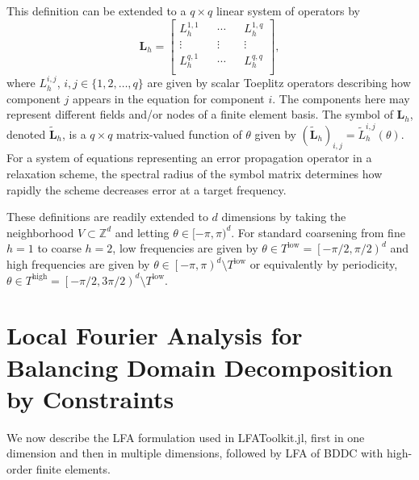 \documentclass[review]{siamart190516}
\begin{document}
This definition can be extended to a $q \times q$ linear system of operators by
\begin{equation}
\mathbf{L}_h =
\begin{bmatrix}
    L_h^{1, 1} && \cdots && L_h^{1, q}        \\
    \vdots               && \vdots && \vdots  \\
    L_h^{q, 1} && \cdots && L_h^{q, q}        \\
\end{bmatrix},
\end{equation}
where $L_h^{i, j}$, $i, j \in \lbrace 1, 2, \dots, q \rbrace$ are given by scalar Toeplitz operators describing how component $j$ appears in the equation for component $i$.
The components here may represent different fields and/or nodes of a finite element basis.
The symbol of $\mathbf{L}_h$, denoted $\tilde{\mathbf{L}}_h$, is a $q \times q$ matrix-valued function of $\theta$ given by $\left( \tilde{\mathbf{L}}_h \right)_{i, j} = \tilde{L}_h^{i, j} \left( \theta \right)$.
For a system of equations representing an error propagation operator in a relaxation scheme, the spectral radius of the symbol matrix determines how rapidly the scheme decreases error at a target frequency.

These definitions are readily extended to $d$ dimensions by taking the neighborhood $V \subset \mathbb Z^d$ and letting $\theta \in [-\pi,\pi)^d$.
For standard coarsening from fine $h=1$ to coarse $h=2$, low frequencies are given by $\theta \in T^{\text{low}} = \left[ - \pi / 2, \pi / 2 \right)^d$ and high frequencies are given by $\theta \in \left[-\pi, \pi \right)^d \setminus T^{\text{low}}$ or equivalently by periodicity, $\theta \in T^{\text{high}} = \left[ - \pi / 2, 3 \pi / 2 \right)^d \setminus T^{\text{low}}$.

\section{Local Fourier Analysis for Balancing Domain Decomposition by Constraints}\label{sec:lfa}

We now describe the LFA formulation used in LFAToolkit.jl, first in one dimension and then in multiple dimensions, followed by LFA of BDDC with high-order finite elements.

\end{document}
